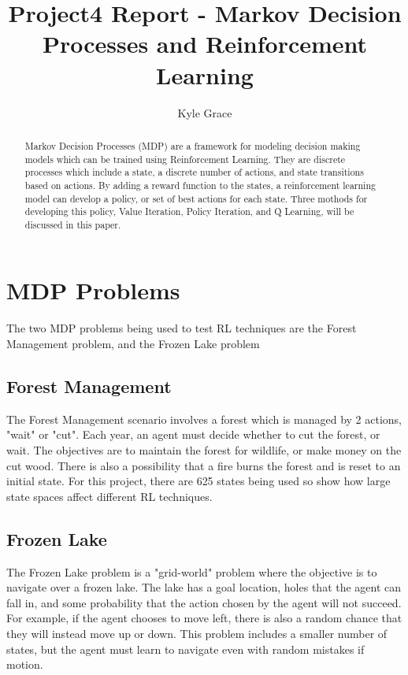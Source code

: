 \documentclass[
	letterpaper, %
]{mlreport}
\author{Kyle Grace}
\title{Project4 Report - Markov Decision Processes and Reinforcement Learning}
\begin{document}

\maketitle

\begin{abstract}
Markov Decision Processes (MDP) are a framework for modeling decision making models which can be trained using Reinforcement Learning. They are discrete processes which include a state, a discrete number of actions, and state transitions based on actions. By adding a reward function to the states, a reinforcement learning model can develop a policy, or set of best actions for each state. Three mothods for developing this policy, Value Iteration, Policy Iteration, and Q Learning, will be discussed in this paper.
\end{abstract}

\section{MDP Problems}
The two MDP problems being used to test RL techniques are the Forest Management problem, and the Frozen Lake problem

\subsection{Forest Management}
The Forest Management scenario involves a forest which is managed by 2 actions, "wait" or "cut". Each year, an agent must decide whether to cut the forest, or wait. The objectives are to maintain the forest for wildlife, or make money on the cut wood. There is also a possibility that a fire burns the forest and is reset to an initial state. For this project, there are 625 states being used so show how large state spaces affect different RL techniques.

\subsection{Frozen Lake}
The Frozen Lake problem is a "grid-world" problem where the objective is to navigate over a frozen lake. The lake has a goal location, holes that the agent can fall in, and some probability that the action chosen by the agent will not succeed. For example, if the agent chooses to move left, there is also a random chance that they will instead move up or down. This problem includes a smaller number of states, but the agent must learn to navigate even with random mistakes if motion.
\end{document}
